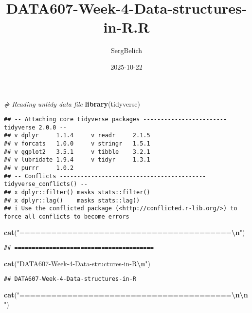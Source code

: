 \documentclass[
]{article}
\title{DATA607-Week-4-Data-structures-in-R.R}
\author{SergBelich}
\date{2025-10-22}
\newenvironment{Shaded}{\begin{snugshade}}{\end{snugshade}}
\newcommand{\CommentTok}[1]{\textcolor[rgb]{0.56,0.35,0.01}{\textit{#1}}}
\newcommand{\FunctionTok}[1]{\textcolor[rgb]{0.13,0.29,0.53}{\textbf{#1}}}
\newcommand{\NormalTok}[1]{#1}
\newcommand{\SpecialCharTok}[1]{\textcolor[rgb]{0.81,0.36,0.00}{\textbf{#1}}}
\newcommand{\StringTok}[1]{\textcolor[rgb]{0.31,0.60,0.02}{#1}}
\begin{document}
\maketitle

\begin{Shaded}
\begin{Highlighting}[]
\CommentTok{\# Reading untidy data file}
\FunctionTok{library}\NormalTok{(tidyverse)}
\end{Highlighting}
\end{Shaded}

\begin{verbatim}
## -- Attaching core tidyverse packages ------------------------ tidyverse 2.0.0 --
## v dplyr     1.1.4     v readr     2.1.5
## v forcats   1.0.0     v stringr   1.5.1
## v ggplot2   3.5.1     v tibble    3.2.1
## v lubridate 1.9.4     v tidyr     1.3.1
## v purrr     1.0.2     
## -- Conflicts ------------------------------------------ tidyverse_conflicts() --
## x dplyr::filter() masks stats::filter()
## x dplyr::lag()    masks stats::lag()
## i Use the conflicted package (<http://conflicted.r-lib.org/>) to force all conflicts to become errors
\end{verbatim}

\begin{Shaded}
\begin{Highlighting}[]
\FunctionTok{cat}\NormalTok{(}\StringTok{"========================================}\SpecialCharTok{\textbackslash{}n}\StringTok{"}\NormalTok{)}
\end{Highlighting}
\end{Shaded}

\begin{verbatim}
## ========================================
\end{verbatim}

\begin{Shaded}
\begin{Highlighting}[]
\FunctionTok{cat}\NormalTok{(}\StringTok{"DATA607{-}Week{-}4{-}Data{-}structures{-}in{-}R}\SpecialCharTok{\textbackslash{}n}\StringTok{"}\NormalTok{)}
\end{Highlighting}
\end{Shaded}

\begin{verbatim}
## DATA607-Week-4-Data-structures-in-R
\end{verbatim}

\begin{Shaded}
\begin{Highlighting}[]
\FunctionTok{cat}\NormalTok{(}\StringTok{"========================================}\SpecialCharTok{\textbackslash{}n\textbackslash{}n}\StringTok{"}\NormalTok{)}
\end{Highlighting}
\end{Shaded}
\end{document}
